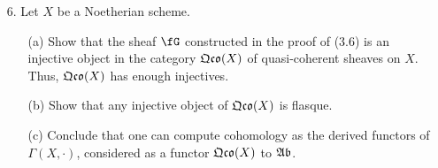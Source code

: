 \documentclass[a4paper]{article}
\begin{document}
\begin{enumerate} [label=\textbf{\arabic*.}, leftmargin=0em]
        \begin{proof}
          Suppose $X = \spec{A}$ is affine for some reduced Noetherian ring $A$.
          The irreducible components of $X$ correspond to the minimal prime ideals $\goth{p}$ of $A$ (A.M. Ex. 1.20).
          In particular, the irreducible components of $X$ are precisely $\spec{A / \goth{p}}$.
          Conversely, let $X_i$ be the irreducible components of $X$, and let $\phi : \fF \to \bigoplus_i j_* \restr{\fF}{X_i}$ be the natural map of $\fO_X$-modules, where $j : X_i \hookrightarrow X$ is the inclusion.
          Since $X$ is Noetherian, $X_i \cap X_j$ is quasi-compact, so we can cover it with a finite number of open affine subsets $X_{ijk}$.
          Because $X$ is reduced, $\phi$ is injective, so we can extend $\phi$ by the following exact sequence
          \[ \begin{tikzcd}
              0 \arrow[r] & \fF \arrow[r] & \bigoplus_i j_* \restr{\fF}{X_i} \arrow[r] & \bigoplus_{i,j} j_* \restr{\fF}{X_{ijk}}.
            \end{tikzcd} \]
          Each $j_* \restr{\fF}{X_i}, j_* \restr{\fF}{X_{ijk}}$ has vanishing cohomology for $i > 0$ by (2.10), (3.5), and (3.7).
          While the sequence above is not surjective on the right, the image is still a quasi-coherent sheaf, so using the long exact sequence of cohomology, we deduce that $H^i(X, \fF) = 0$ for $i > 0$.
          Hence, $X$ is affine by (3.7).
        \end{proof}

  \item[6.] Let $X$ be a Noetherian scheme.
        \begin{itemize}
          \item[(a)] Show that the sheaf $\fG$ constructed in the proof of (3.6) is an injective object in the category $\mathfrak{Qco}(X)$ of quasi-coherent sheaves on $X$.
                Thus, $\mathfrak{Qco}(X)$ has enough injectives.

          \item[(b)] Show that any injective object of $\mathfrak{Qco}(X)$ is flasque.

          \item[(c)] Conclude that one can compute cohomology as the derived functors of $\Gamma(X, \cdot)$, considered as a functor $\mathfrak{Qco}(X)$ to $\mathfrak{Ab}$.
        \end{itemize}


\end{enumerate}
\end{document}
